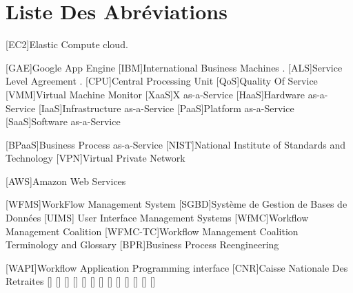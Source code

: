  
 \chapter*{Liste Des Abréviations}
 \begin{acronym}
 [EC2]{Elastic Compute cloud}.
 	
 	
  	[GAE]{Google App Engine}	
 	[IBM]{International Business Machines}	 .
 	[ALS]{Service Level Agreement} .	 
  	[CPU]{Central Processing Unit}	
    [QoS]{Quality Of Service}	 
    [VMM]{Virtual Machine Monitor}  
	[XaaS]{X as-a-Service}	
    	[HaaS]{Hardware as-a-Service}	
    		{Infrastructure as-a-Service}	
    			[PaaS]{Platform as-a-Service}	
    				[SaaS]{Software as-a-Service}	
    
    [BPaaS]{Business Process as-a-Service}	 
    [NIST]{National Institute of Standards and Technology} 	
 	  [VPN]{Virtual Private Network}
 	  
 	  
 	  
 	  [AWS]{Amazon Web Services
 	  }
   
 	  [WFMS]{WorkFlow Management System}
 	  [SGBD]{Système de Gestion de Bases de Données}
 	   [UIMS]{ User Interface Management Systems}
 	    [WfMC]{Workflow Management Coalition }
 	     [WFMC-TC]{Workflow Management Coalition Terminology and Glossary}
 	      [BPR]{Business Process Reengineering} 
 	      
 	          [WAPI]{Workflow Application Programming interface}
 	       [CNR]{Caisse Nationale Des Retraites}
 	       \acro{}[]{}
 	       \acro{}[]{}
 	       \acro{}[]{}
 	       \acro{}[]{}
 	       \acro{}[]{}
 	       \acro{}[]{}
 	       \acro{}[]{}
 	       \acro{}[]{}
 	       \acro{}[]{}
 	       \acro{}[]{}
 	       \acro{}[]{}
 	       \acro{}[]{}
 	       \acro{}[]{}
 	      
 	       
 \end{acronym}
 